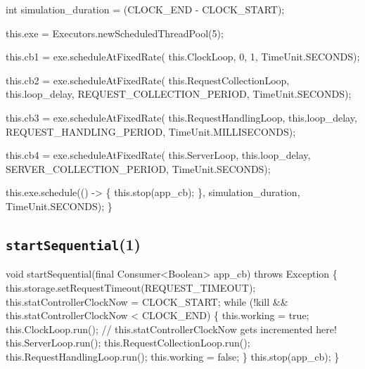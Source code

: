   int simulation_duration = (CLOCK_END - CLOCK_START);

  this.exe = Executors.newScheduledThreadPool(5);

  this.cb1 = exe.scheduleAtFixedRate(
    this.ClockLoop, 0, 1, TimeUnit.SECONDS);

  this.cb2 = exe.scheduleAtFixedRate(
    this.RequestCollectionLoop, this.loop_delay, REQUEST_COLLECTION_PERIOD, TimeUnit.SECONDS);

  this.cb3 = exe.scheduleAtFixedRate(
    this.RequestHandlingLoop, this.loop_delay, REQUEST_HANDLING_PERIOD, TimeUnit.MILLISECONDS);

  this.cb4 = exe.scheduleAtFixedRate(
    this.ServerLoop, this.loop_delay, SERVER_COLLECTION_PERIOD, TimeUnit.SECONDS);

  this.exe.schedule(() -> \{
    this.stop(app_cb);
  \}, simulation_duration, TimeUnit.SECONDS);
\}
\eatline
{}\nwendcode{}\nwdocspar
\subsection{\texttt{startSequential}(1)}
\nwenddocs{}\endmoddef{}
void startSequential(final Consumer<Boolean> app_cb) throws Exception \{
  this.storage.setRequestTimeout(REQUEST_TIMEOUT);
  this.statControllerClockNow = CLOCK_START;
  while (!kill && this.statControllerClockNow < CLOCK_END) \{
    this.working = true;
    this.ClockLoop.run();  // this.statControllerClockNow gets incremented here!
    this.ServerLoop.run();
    this.RequestCollectionLoop.run();
    this.RequestHandlingLoop.run();
    this.working = false;
  \}
  this.stop(app_cb);
\}
\eatline
{}\nwendcode{}\nwdocspar

